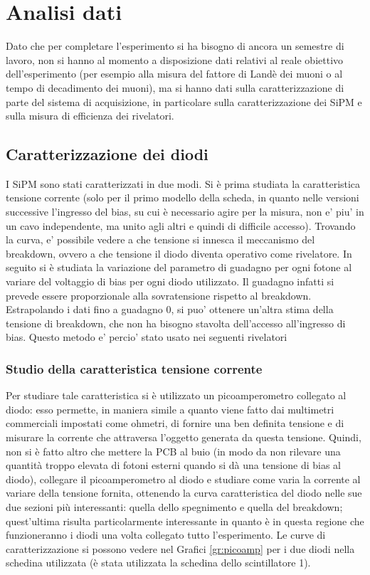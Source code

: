 \section{Analisi dati}
Dato che per completare l'esperimento si ha bisogno di ancora un semestre di lavoro, non si hanno al momento a disposizione dati relativi al reale obiettivo dell'esperimento
(per esempio alla misura del fattore di Landè dei muoni o al tempo di decadimento dei muoni), ma si hanno dati sulla caratterizzazione di parte del sistema di acquisizione,
in particolare sulla caratterizzazione dei SiPM e sulla misura di efficienza dei rivelatori.

\subsection{Caratterizzazione dei diodi}
I SiPM sono stati caratterizzati in due modi. Si è prima studiata la caratteristica tensione corrente (solo per il primo modello della scheda, in quanto nelle versioni successive l'ingresso del bias, su cui \`e necessario agire per la misura, non e' piu' in un cavo independente, ma unito agli altri e quindi di difficile accesso). Trovando la curva, e' possibile vedere a che tensione si innesca il meccanismo del breakdown, ovvero a che tensione il diodo diventa operativo come rivelatore.
In seguito si è studiata la variazione del parametro di guadagno per ogni fotone al variare del voltaggio di bias per ogni diodo utilizzato. Il guadagno infatti si prevede essere proporzionale alla sovratensione rispetto al breakdown. Estrapolando i dati fino a guadagno 0, si puo' ottenere un'altra stima della tensione di breakdown, che non ha bisogno stavolta dell'accesso all'ingresso di bias. Questo metodo e' percio' stato usato nei seguenti rivelatori

\subsubsection{Studio della caratteristica tensione corrente}
Per studiare tale caratteristica si è utilizzato un picoamperometro collegato al diodo: esso permette, in maniera simile a quanto viene fatto dai multimetri commerciali
impostati come ohmetri, di fornire una ben definita tensione e di misurare la corrente che attraversa l'oggetto generata da questa tensione. Quindi,
non si è fatto altro che mettere la PCB al buio (in modo da non rilevare una quantità troppo elevata di fotoni esterni quando si dà una tensione di bias al diodo),
collegare il picoamperometro al diodo e studiare come varia la corrente al variare della tensione fornita, ottenendo la curva caratteristica del diodo nelle sue due
sezioni più interessanti: quella dello spegnimento e quella del breakdown; quest'ultima risulta particolarmente interessante in quanto è in questa regione che funzioneranno
i diodi una volta collegato tutto l'esperimento. Le curve di caratterizzazione si possono vedere nel Grafici \ref{gr:picoamp} per i due  diodi nella schedina utilizzata (è stata utilizzata la schedina dello scintillatore 1).


